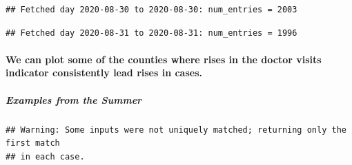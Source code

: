 \documentclass[]{article}
\newenvironment{Shaded}{\begin{snugshade}}{\end{snugshade}}
\newcommand{\DataTypeTok}[1]{\textcolor[rgb]{0.13,0.29,0.53}{#1}}
\newcommand{\DecValTok}[1]{\textcolor[rgb]{0.00,0.00,0.81}{#1}}
\newcommand{\KeywordTok}[1]{\textcolor[rgb]{0.13,0.29,0.53}{\textbf{#1}}}
\newcommand{\NormalTok}[1]{#1}
\newcommand{\OperatorTok}[1]{\textcolor[rgb]{0.81,0.36,0.00}{\textbf{#1}}}
\newcommand{\StringTok}[1]{\textcolor[rgb]{0.31,0.60,0.02}{#1}}
\let\oldparagraph\paragraph
\renewcommand{\paragraph}[1]{\oldparagraph{#1}\mbox{}}
\let\oldsubparagraph\subparagraph
\renewcommand{\subparagraph}[1]{\oldsubparagraph{#1}\mbox{}}
\begin{document}
\begin{verbatim}
## Fetched day 2020-08-30 to 2020-08-30: num_entries = 2003
\end{verbatim}

\begin{verbatim}
## Fetched day 2020-08-31 to 2020-08-31: num_entries = 1996
\end{verbatim}

\begin{Shaded}
\end{Shaded}

\hypertarget{we-can-plot-some-of-the-counties-where-rises-in-the-doctor-visits-indicator-consistently-lead-rises-in-cases.}{%
\paragraph{We can plot some of the counties where rises in the doctor
visits indicator consistently lead rises in
cases.}\label{we-can-plot-some-of-the-counties-where-rises-in-the-doctor-visits-indicator-consistently-lead-rises-in-cases.}}

\hypertarget{examples-from-the-summer}{%
\subparagraph{Examples from the Summer}\label{examples-from-the-summer}}

\begin{verbatim}
## Warning: Some inputs were not uniquely matched; returning only the first match
## in each case.
\end{verbatim}
\end{document}
